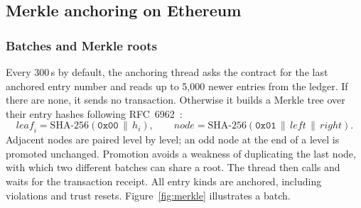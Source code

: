 \subsection{Merkle anchoring on Ethereum}
\label{sec:design-anchoring}

\subsubsection{Batches and Merkle roots}
Every 300\,s by default, the anchoring thread asks the contract for the last anchored entry number and reads up to 5{,}000 newer entries from the ledger. If there are none, it sends no transaction. Otherwise it builds a Merkle tree over their entry hashes following RFC~6962~\cite{rfc6962}:
\begin{equation}
\mathit{leaf}_i = \mathrm{SHA\mbox{-}256}(\mathtt{0x00} \,\|\, h_i), \qquad \mathit{node} = \mathrm{SHA\mbox{-}256}(\mathtt{0x01} \,\|\, \mathit{left} \,\|\, \mathit{right}).
\end{equation}
Adjacent nodes are paired level by level; an odd node at the end of a level is promoted unchanged. Promotion avoids a weakness of duplicating the last node, with which two different batches can share a root. The thread then calls  and waits for the transaction receipt. All entry kinds are anchored, including violations and trust resets. Figure~\ref{fig:merkle} illustrates a batch.

